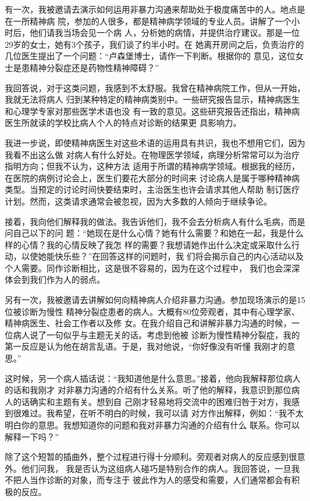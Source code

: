 \documentclass{ctexart}
\begin{document}
有一次，我被邀请去演示如何运用非暴力沟通来帮助处于极度痛苦中的人。地点是在一所精神病
院，参加的人很多，都是精神病学领域的专业人员。讲解了一个小时后，他们请我当场会见一个病
人，分析她的病情，并提供治疗建议。那是一位29岁的女士，她有3个孩子，我们谈了约半小时。在
她离开房间之后，负责治疗的几位医生提出了一个问题：``卢森堡博士，请作一下判断。根据你的
意见，这位女士是患精神分裂症还是药物性精神障碍？''

我回答说，对于这类问题，我感到不太舒服。我曾在精神病院工作，但从一开始，我就无法将病人
归到某种特定的精神病类别中。一些研究报告显示，精神病医生和心理学专家对那些医学术语也没
有一致的意见。这些研究报告还指出，精神病医生所就读的学校比病人个人的特点对诊断的结果更
具影响力。

我进一步说，即使精神病医生对这些术语的运用具有共识，我也不想用它们，因为我看不出这么做
对病人有什么好处。在物理医学领域，病理分析常常可以为治疗指明方向；但我不认为，这种方法
适用于所谓的精神病学领域。根据我的经历，在医院的病例讨论会上，医生们要花大部分的时间来
讨论病人是属于哪种精神病类型。当预定的讨论时间快要结束时，主治医生也许会请求其他人帮助
制订医疗计划。然而，这类请求通常会被忽视，因为大多数的人倾向于继续争论。

接着，我向他们解释我的做法。我告诉他们，我不会去分析病人有什么毛病，而是问自己以下的问
题：``她现在是什么心情？她有什么需要？和她在一起，我是什么样的心情？我的心情反映了我怎
样的需要？我想请她作出什么决定或采取什么行动，以使她能快乐些？''在回答这样的问题时，我
们将会揭示自己的内心活动以及个人需要。同作诊断相比，这是很不容易的，因为在这个过程中，
我们也会深深体会到我们作为人的弱点。

另有一次，我被邀请去讲解如何向精神病人介绍非暴力沟通。参加现场演示的是15位被诊断为慢性
精神分裂症患者的病人。大概有80位旁观者，其中有心理学家、精神病医生、社会工作者以及修
女。在我介绍自己和讲解非暴力沟通的时候，一位病人说了一句似乎与主题无关的话。考虑到他被
诊断为慢性精神分裂症，我的第一反应是认为他在胡言乱语。于是，我对他说，``你好像没有听懂
我刚才的意思。''

这时候，另一个病人插话说：``我知道他是什么意思。''接着，他向我解释那位病人的话和我刚才
对非暴力沟通的介绍有什么关系。听了他的解释，我意识到那位病人的话确实和主题有关。想到自
己刚才轻易地将交流中的困难归咎于对方，我感到很难过。我希望，在听不明白的时候，我可以请
对方作出解释，例如：``我不太明白你的意思。我想知道你的问题和我对非暴力沟通的介绍有什么
联系。你可以解释一下吗？''

除了这个短暂的插曲外，整个过程进行得十分顺利。旁观者对病人的反应感到很意外。他们问我，
我是否认为这组病人碰巧是特别合作的病人。我回答说，一旦我不把人当作诊断的对象，而专注于
彼此作为人的感受和需要，人们通常都会有积极的反应。
\end{document}
